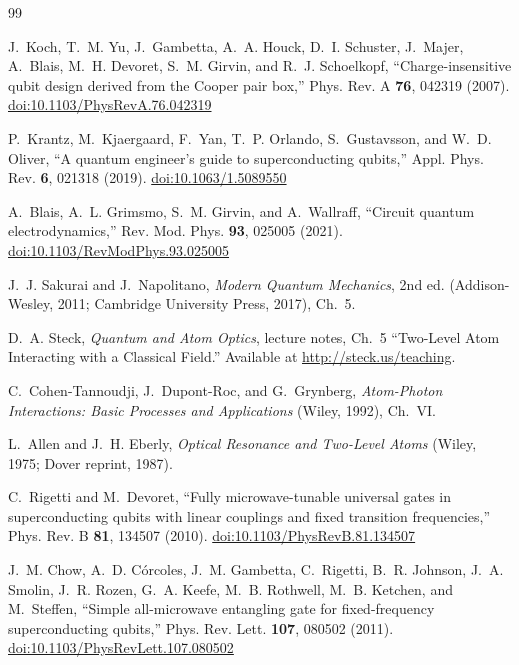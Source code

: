 \documentclass[11pt,a4paper]{article}
\begin{document}
\begin{thebibliography}{99}
\small

J.~Koch, T.~M. Yu, J.~Gambetta, A.~A. Houck, D.~I. Schuster, J.~Majer, A.~Blais, M.~H. Devoret, S.~M. Girvin, and
R.~J. Schoelkopf, ``Charge-insensitive qubit design derived from the Cooper pair box,'' Phys. Rev. A \textbf{76},
042319 (2007). \href{https://doi.org/10.1103/PhysRevA.76.042319}{doi:10.1103/PhysRevA.76.042319}

P.~Krantz, M.~Kjaergaard, F.~Yan, T.~P. Orlando, S.~Gustavsson, and W.~D. Oliver, ``A quantum engineer's guide to
superconducting qubits,'' Appl. Phys. Rev. \textbf{6}, 021318 (2019).
\href{https://doi.org/10.1063/1.5089550}{doi:10.1063/1.5089550}

A.~Blais, A.~L. Grimsmo, S.~M. Girvin, and A.~Wallraff, ``Circuit quantum electrodynamics,'' Rev. Mod. Phys.
\textbf{93}, 025005 (2021). \href{https://doi.org/10.1103/RevModPhys.93.025005}{doi:10.1103/RevModPhys.93.025005}

J.~J. Sakurai and J.~Napolitano, \emph{Modern Quantum Mechanics}, 2nd ed. (Addison-Wesley, 2011; Cambridge University
Press, 2017), Ch.~5.

D.~A. Steck, \emph{Quantum and Atom Optics}, lecture notes, Ch.~5 ``Two-Level Atom Interacting with a Classical
Field.'' Available at \url{http://steck.us/teaching}.

C.~Cohen-Tannoudji, J.~Dupont-Roc, and G.~Grynberg, \emph{Atom-Photon Interactions: Basic Processes and
Applications} (Wiley, 1992), Ch.~VI.

L.~Allen and J.~H. Eberly, \emph{Optical Resonance and Two-Level Atoms} (Wiley, 1975; Dover reprint, 1987).

C.~Rigetti and M.~Devoret, ``Fully microwave-tunable universal gates in superconducting qubits with linear couplings
and fixed transition frequencies,'' Phys. Rev. B \textbf{81}, 134507 (2010).
\href{https://doi.org/10.1103/PhysRevB.81.134507}{doi:10.1103/PhysRevB.81.134507}

J.~M. Chow, A.~D. C\'orcoles, J.~M. Gambetta, C.~Rigetti, B.~R. Johnson, J.~A. Smolin, J.~R. Rozen, G.~A. Keefe,
M.~B. Rothwell, M.~B. Ketchen, and M.~Steffen, ``Simple all-microwave entangling gate for fixed-frequency
superconducting qubits,'' Phys. Rev. Lett. \textbf{107}, 080502 (2011).
\href{https://doi.org/10.1103/PhysRevLett.107.080502}{doi:10.1103/PhysRevLett.107.080502}


\end{thebibliography}
\end{document}
